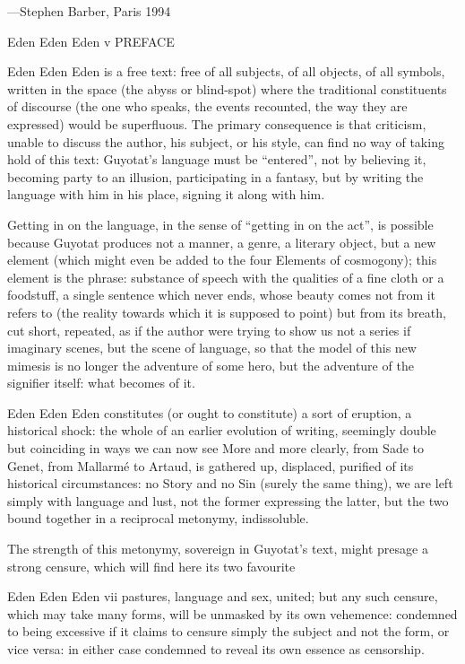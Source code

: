 —Stephen Barber, Paris 1994

Eden Eden Eden v
PREFACE

Eden Eden Eden is a free text: free of all subjects, of all objects, of
all symbols, written in the space (the abyss or blind-spot) where the
traditional constituents of discourse (the one who speaks, the events
recounted, the way they are expressed) would be superfluous. The
primary consequence is that criticism, unable to discuss the author,
his subject, or his style, can find no way of taking hold of this text:
Guyotat's language must be “entered”, not by believing it, becoming
party to an illusion, participating in a fantasy, but by writing the
language with him in his place, signing it along with him.

Getting in on the language, in the sense of “getting in on the
act”, is possible because Guyotat produces not a manner, a genre, a
literary object, but a new element (which might even be added to the
four Elements of cosmogony); this element is the phrase: substance
of speech with the qualities of a fine cloth or a foodstuff, a single
sentence which never ends, whose beauty comes not from it refers
to (the reality towards which it is supposed to point) but from its
breath, cut short, repeated, as if the author were trying to show us
not a series if imaginary scenes, but the scene of language, so that
the model of this new mimesis is no longer the adventure of some
hero, but the adventure of the signifier itself: what becomes of it.

Eden Eden Eden constitutes (or ought to constitute) a sort
of eruption, a historical shock: the whole of an earlier evolution of
writing, seemingly double but coinciding in ways we can now see
More and more clearly, from Sade to Genet, from Mallarmé to Artaud,
is gathered up, displaced, purified of its historical circumstances: no
Story and no Sin (surely the same thing), we are left simply with
language and lust, not the former expressing the latter, but the two
bound together in a reciprocal metonymy, indissoluble.

The strength of this metonymy, sovereign in Guyotat's text,
might presage a strong censure, which will find here its two favourite

Eden Eden Eden vii
pastures, language and sex, united; but any such censure, which may
take many forms, will be unmasked by its own vehemence:
condemned to being excessive if it claims to censure simply the
subject and not the form, or vice versa: in either case condemned to
reveal its own essence as censorship.

